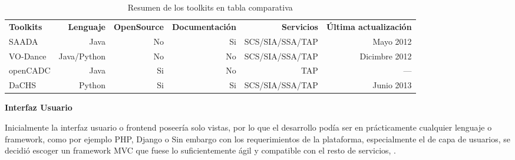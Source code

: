 \begin{table}[ht]
\centering
\caption{Resumen de los toolkits en tabla comparativa}
\begin{tabular}{lrrrrr}
    {\bf Toolkits} & {\bf Lenguaje} & {\bf OpenSource} & {\bf Documentación} & {\bf Servicios} & {\bf Última actualización}  \\
    SAADA          & Java           & No               & Si                  & SCS/SIA/SSA/TAP & Mayo 2012     \\
    VO-Dance       & Java/Python    & No               & No                  & SCS/SIA/SSA/TAP & Dicimbre 2012 \\
    openCADC       & Java           & Si               & No                  & TAP             & ---           \\
    DaCHS          & Python         & Si               & Si                  & SCS/SIA/SSA/TAP & Junio 2013    \\
\end{tabular}
\label{table:toolkits}
\end{table}

\textbf{Interfaz Usuario}

Inicialmente la interfaz usuario o frontend poseería solo vistas, por lo que
el desarrollo podía ser en prácticamente cualquier lenguaje o framework, como por
ejemplo PHP, Django o {\ror} Sin embargo con los requerimientos de la
plataforma, especialmente el de capa de usuarios, se decidió escoger un
framework MVC que fuese lo suficientemente ágil y compatible con el resto de
servicios, {\ror}.
